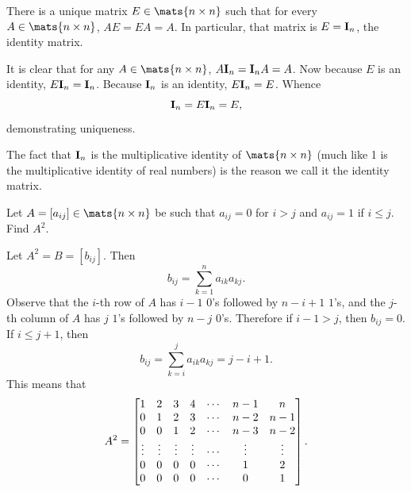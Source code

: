 \begin{thm} 
There is a unique matrix $E\in\mats{n\times n}$ such that 
for every $A\in\mats{n\times n}$, 
$AE = EA = A$. In particular, that
matrix is $E = {\bf I}_n$, the identity matrix. 

\begin{pf}
It is clear that for any $A\in\mats{n\times n}$, $A{\bf I}_n
= {\bf I}_nA = A$. Now because $E$ is an identity, $E{\bf I}_n =
{\bf I}_n$. Because ${\bf I}_n$ is an identity, $E{\bf I}_n =  E$.
Whence
$${\bf
I}_n = E{\bf I}_n =  E,$$demonstrating uniqueness.
\end{pf}
\end{thm}

\begin{rem}
The fact that ${\bf I}_n$ is the multiplicative identity of 
$\mats{n\times n}$
(much like 1 is the multiplicative identity of real numbers) is
the reason we call it the identity matrix.
\end{rem}

\begin{exa}
Let $A = [a_{ij}]\in \mats{n\times n}$ be such that $a_{ij} = 0$
for $i > j$ and $a_{ij} = 1$ if $i \leq j$. Find $A^2$. 
\begin{sol} Let $A^2 = B = [b_{ij}]$. Then
$$b_{ij} = \sum_{k = 1} ^n a_{ik}a_{kj}.$$Observe that the $i$-th
row of $A$ has $i - 1$ $0$'s followed by $n - i + 1$ $1$'s, and
the $j$-th column of $A$ has $j$ $1$'s followed by $n - j$ 0's.
Therefore if $i - 1 > j$, then $b_{ij} = 0$. If $i \leq j + 1$,
then $$b_{ij} = \sum_{k = i} ^{j} a_{ik}a_{kj} = j - i + 1.$$ This
means that $$A^2 = \begin{bmatrix} 1 & 2 & 3 & 4 & \cdots & n - 1
& n \cr 0 & 1 & 2 & 3 & \cdots & n - 2 & n - 1 \cr 0 & 0 & 1 & 2 &
\cdots & n - 3 & n - 2 \cr \vdots & \vdots & \vdots & \vdots &
\cdots &\vdots & \vdots \cr 0 & 0 & 0 & 0 & \cdots & 1 & 2 \cr 0 &
0 & 0 & 0 & \cdots & 0 & 1\cr
\end{bmatrix}.$$
\end{sol}
\end{exa}


